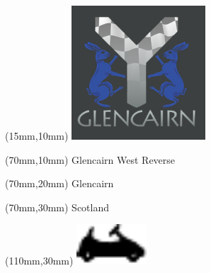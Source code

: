 \null\newpage
\begin{textblock*}{50mm}(15mm,10mm)%
\includegraphics[width=50mm]{LG/GLCN.png}
\end{textblock*}
\begin{textblock*}{130mm}(70mm,10mm)%
{\fontsize{20}{20}\selectfont Glencairn West Reverse}\\
\end{textblock*}
\begin{textblock*}{120mm}(70mm,20mm)%
{\fontsize{16}{16}\selectfont Glencairn}\\
\end{textblock*}
\begin{textblock*}{120mm}(70mm,30mm)%
{\fontsize{12}{12}\selectfont Scotland}
\end{textblock*}
\begin{textblock*}{30mm}(110mm,30mm)%
\centering
\includegraphics[height=15mm]{icons/kart.pdf}
\end{textblock*}
